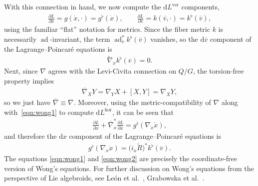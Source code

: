\documentclass[10pt,a4paper]{amsart}
\numberwithin{equation}{section}
\begin{document}
\begin{Example}
With this connection in hand, we now compute the $ \mathrm{d} L ^{ \text{ver} } $ components,
 \begin{gather*}
 \frac{ \partial L }{ \partial \dot{x} } = g ( \dot{x}, \cdot ) = g ^\flat ( \dot{x} ) , \qquad \frac{ \partial L }{ \partial \overline{ v } } = k ( \overline{ v } , \cdot ) = k ^\flat ( \overline{ v } ) ,
 \end{gather*}
using the familiar ``f\/lat'' notation for metrics. Since the f\/iber metric $k$ is necessarily $ \operatorname{ad} $-invariant, the term $ \operatorname{ad} ^\ast _{ \overline{ v } } k ^\flat ( \overline{ v } ) $ vanishes, so the $ \mathrm{d} \overline{ v } $ component of the Lagrange--Poincar\'e equations is
 \begin{gather} \label{eqn:wong1}
 \widetilde{ \nabla } _{ \dot{x} } k ^\flat ( \overline{ v } ) = 0 .
 \end{gather}
 Next, since $ \nabla $ agrees with the Levi-Civita connection on $ Q / G $, the torsion-free property implies
 \begin{gather*}
 \overline{ \nabla } _X Y = \nabla _Y X + [X, Y ] = \nabla _X Y ,
 \end{gather*}
so we just have $ \overline{ \nabla } \equiv \nabla $. Moreover, using the metric-compatibility of $ \nabla $ along with~\eqref{eqn:wong1} to compute $ \mathrm{d} L ^{ \text{hor} } $, it can be seen that
 \begin{gather*}
 \frac{ \partial L }{ \partial x } + \overline{ \nabla } _{ \dot{x} } ^\ast \frac{ \partial L }{ \partial \dot{x} } = g ^\flat ( \nabla _{ \dot{x} } \dot{x} ) ,
 \end{gather*}
 and therefore the $ \mathrm{d} x $ component of the Lagrange--Poincar\'e equations is
 \begin{gather} \label{eqn:wong2}
 g ^\flat ( \nabla _{ \dot{x} } \dot{x} ) = \big( i _{ \dot{x} } \widetilde{ R } \big) ^\ast k ^\flat ( \overline{ v } ) .
 \end{gather}
The equations \eqref{eqn:wong1} and \eqref{eqn:wong2} are precisely the coordinate-free version of Wong's equations. For further discussion on Wong's equations from the perspective of Lie algebroids, see Le\'on et al.~\cite{LeMaMa2005}, Grabowska et al.~\cite{GrUrGr2006}.


\end{Example}
\end{document}
